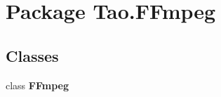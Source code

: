 \hypertarget{namespace_tao_1_1_f_fmpeg}{
\section{Package Tao.FFmpeg}
\label{namespace_tao_1_1_f_fmpeg}
}
\subsection*{Classes}
\begin{DoxyCompactItemize}
\item 
class {\bfseries FFmpeg}
\end{DoxyCompactItemize}
